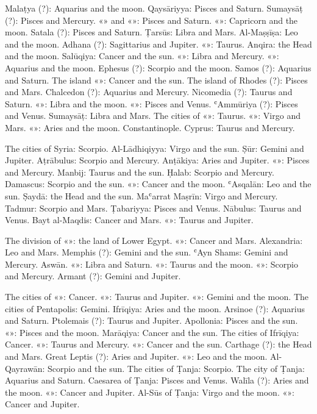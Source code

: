 \documentclass[11pt]{article}
\newcommand{\Fol}[1]{\marginpar{\footnotesize\color{gray}f.\,#1}}
\begin{document}
\par Malaṭya (?): Aquarius and the moon. Qaysāriyya: Pisces and Saturn. Sumaysāṭ (?): Pisces and Mercury. «» and «»: Pisces and Saturn. «»: Capricorn and the moon. Satala (?): Pisces and Saturn. Ṭarsūs: Libra and Mars. Al-Maṣṣīṣa: Leo and the moon. Adhana (?): Sagittarius and Jupiter. «»: Taurus. Anqira: the Head and the moon. Salūqiya: Cancer and the sun. «»: Libra and Mercury. «»: Aquarius and the moon. Ephesus (?): Scorpio and the moon. Samos (?): Aquarius and Saturn. The island «»: Cancer and the sun. The island of Rhodes (?): Pisces and Mars. Chalcedon (?): Aquarius and Mercury. Nicomedia (?): Taurus and Saturn. «»: Libra and the moon. «»: Pisces and Venus. ʿAmmūriya (?): Pisces and Venus. Sumaysāṭ: Libra and Mars. The cities of «»: Taurus. «»: Virgo and Mars. «»: Aries and the moon. Constantinople. Cyprus: Taurus and Mercury.\par
\par \Fol{25v}The cities of Syria: Scorpio. Al-Lādhiqiyya: Virgo and the sun. Ṣūr: Gemini and Jupiter. Aṭrābulus: Scorpio and Mercury. Anṭākiya: Aries and Jupiter. «»: Pisces and Mercury. Manbij: Taurus and the sun. Ḥalab: Scorpio and Mercury. Damascus: Scorpio and the sun. «»: Cancer and the moon. ʿAsqalān: Leo and the sun. Ṣaydā: the Head and the sun. Maʿarrat Maṣrīn: Virgo and Mercury. Tadmur: Scorpio and Mars. Ṭabariyya: Pisces and Venus. Nābulus: Taurus and Venus. Bayt al-Maqdis: Cancer and Mars. «»: Taurus and Jupiter.\par
\par The division of «»: the land of Lower Egypt. «»: Cancer and Mars. Alexandria: Leo and Mars. Memphis (?): Gemini and the sun. ʿAyn Shams: Gemini and Mercury. Aswān. «»: Libra and Saturn. «»: Taurus and the moon. «»: Scorpio and Mercury. Armant (?): Gemini and Jupiter.\par
\par The cities of «»: Cancer. «»: Taurus and Jupiter. «»: Gemini and the moon. The cities of Pentapolis: Gemini. Ifrīqiya: Aries and the moon. Arsinoe (?): Aquarius and Saturn. Ptolemais (?): Taurus and Jupiter. Apollonia: Pisces and the sun. «»: Pisces and the moon. Marāqiya: Cancer and the sun. The cities of Ifrīqiya: Cancer. «»: Taurus and Mercury. «»: Cancer and the sun. Carthage (?): the Head and Mars. Great Leptis (?): Aries and Jupiter. «»: Leo and the moon. Al-Qayrawān: Scorpio and the sun. The cities of Ṭanja: Scorpio. The city of Ṭanja: Aquarius and Saturn. Caesarea of Ṭanja: Pisces and Venus. Walīla (?): Aries and the moon. «»: Cancer and Jupiter. Al-Sūs of Ṭanja: Virgo and the moon. «»: Cancer and Jupiter.\par
\end{document}
